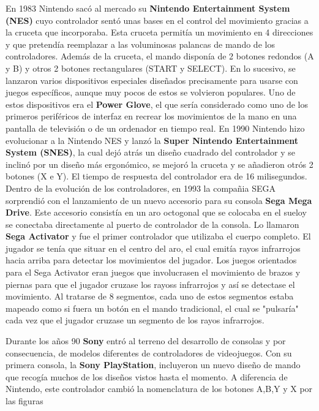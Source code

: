 En 1983 Nintendo sac\'o al mercado su \textbf{Nintendo Entertainment System (NES)} cuyo controlador sent\'o unas bases en el control del movimiento gracias a la cruceta que incorporaba. Esta cruceta permit\'ia un movimiento en 4 direcciones y que pretend\'ia reemplazar a las voluminosas palancas de mando de los controladores. Adem\'as de la cruceta, el mando dispon\'ia de 2 botones redondos (A y B) y otros 2 botones rectangulares (START y SELECT). En lo sucesivo, se lanzaron varios dispositivos especiales dise\~nados precisamente para usarse con juegos espec\'ificos, aunque muy pocos de estos se volvieron populares. Uno de estos dispositivos era el \textbf{Power Glove}, el que ser\'ia considerado como uno de los primeros perif\'ericos de interfaz en recrear los movimientos de la mano en una pantalla de televisi\'on o de un ordenador en tiempo real. En 1990 Nintendo hizo evolucionar a la Nintendo NES y lanz\'o la \textbf{Super Nintendo Entertainment System (SNES)}, la cual dej\'o atr\'as un dise\~no cuadrado del controlador y se inclin\'o por un dise\~no m\'as ergon\'omico, se mejor\'o la cruceta y se a\~nadieron otr\'os 2 botones (X e Y). El tiempo de respuesta del controlador era de 16 milisegundos. Dentro de la evoluci\'on de los controladores, en 1993 la compa\~nia SEGA sorprendi\'o con el lanzamiento de un nuevo accesorio para su consola \textbf{Sega Mega Drive}. Este accesorio consist\'ia en un aro octogonal que se colocaba en el sueloy se conectaba directamente al puerto de controlador de la consola. Lo llamaron \textbf{Sega Activator} y fue el primer controlador que utilizaba el cuerpo completo. El jugador se ten\'ia que situar en el centro del aro, el cual emit\'ia rayos infrarrojos hacia arriba para detectar los movimientos del jugador. Los juegos orientados para el Sega Activator eran juegos que involucrasen el movimiento de brazos y piernas para que el jugador cruzase los rayoss infrarrojos y as\'i se detectase el movimiento. Al tratarse de 8 segmentos, cada uno de estos segmentos estaba mapeado como si fuera un bot\'on en el mando tradicional, el cual se "pulsar\'ia" cada vez que el jugador cruzase un segmento de los rayos infrarrojos. \par

Durante los a\~nos 90 \textbf{Sony} entr\'o al terreno del desarrollo de consolas y por consecuencia, de modelos diferentes de controladores de videojuegos. Con su primera consola, la \textbf{Sony PlayStation}, incluyeron un nuevo dise\~no de mando que recog\'ia muchos de los dise\~nos vistos hasta el momento. A diferencia de Nintendo, este controlador cambi\'o la nomenclatura de los botones A,B,Y y X por las figuras 

